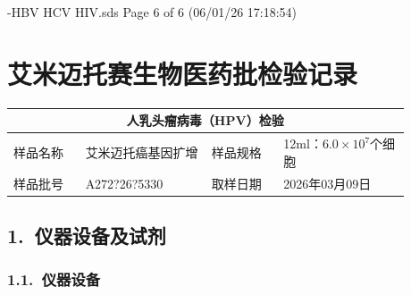 \documentclass[UTF8,10pt,a4paper,fontset=fandol]{ctexart}
\newcommand{\fieldvalue}[1]{#1}
\newcommand{\handwritten}[1]{#1}
\begin{document}
\vfill

-HBV HCV HIV.sds
\hfill
Page 6 of 6 (06/01/26 17:18:54)

\newpage

\section*{艾米迈托赛生物医药批检验记录}

\begin{center}
\begin{tabular}{|p{0.16\linewidth}|p{0.28\linewidth}|p{0.16\linewidth}|p{0.28\linewidth}|}
\hline
\multicolumn{4}{|c|}{人乳头瘤病毒（HPV）检验} \\
\hline
样品名称 &
\fieldvalue{艾米迈托癌基因扩增} &
样品规格 &
\fieldvalue{12ml：$6.0\times10^7$个细胞} \\
\hline
样品批号 &
\fieldvalue{\handwritten{A272?26?5330}} &
取样日期 &
\fieldvalue{\handwritten{2026年03月09日}} \\
\hline
\end{tabular}
\end{center}

\subsection*{1.\ 仪器设备及试剂}

\subsubsection*{1.1.\ 仪器设备}
\end{document}
